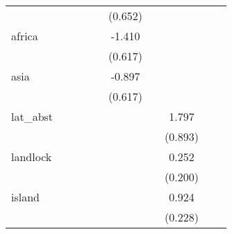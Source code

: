 {\begin{tabular}{l*{9}{c}}
            &                     &                     &                     &                     &     (0.652)         &                     &                     &                     &                     \\
[1em]
africa      &                     &                     &                     &                     &      -1.410\sym{**} &                     &                     &                     &                     \\
            &                     &                     &                     &                     &     (0.617)         &                     &                     &                     &                     \\
[1em]
asia        &                     &                     &                     &                     &      -0.897         &                     &                     &                     &                     \\
            &                     &                     &                     &                     &     (0.617)         &                     &                     &                     &                     \\
[1em]
lat\_abst    &                     &                     &                     &                     &                     &                     &       1.797\sym{**} &                     &                     \\
            &                     &                     &                     &                     &                     &                     &     (0.893)         &                     &                     \\
[1em]
landlock    &                     &                     &                     &                     &                     &                     &       0.252         &                     &                     \\
            &                     &                     &                     &                     &                     &                     &     (0.200)         &                     &                     \\
[1em]
island      &                     &                     &                     &                     &                     &                     &       0.924\sym{***}&                     &                     \\
            &                     &                     &                     &                     &                     &                     &     (0.228)         &                     &                     \\

\end{tabular}}
